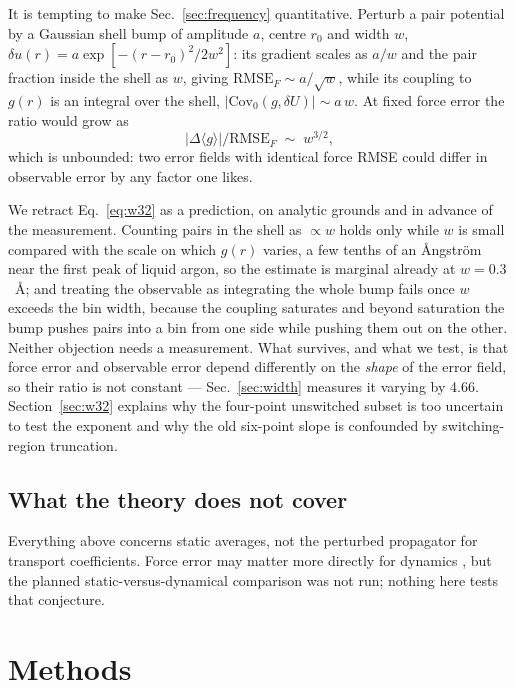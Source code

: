\documentclass[aip,jcp,reprint,amsmath,amssymb,floatfix]{revtex4-2}
\newcommand{\dU}{\ensuremath{\delta U}}
\newcommand{\avg}[1]{\ensuremath{\langle #1 \rangle}}
\newcommand{\Cov}{\ensuremath{\mathrm{Cov}}}
\begin{document}
It is tempting to make Sec.~\ref{sec:frequency} quantitative. Perturb a pair
potential by a Gaussian shell bump of
amplitude $a$, centre $r_0$ and width $w$, $\delta u(r) = a\exp[-(r-r_0)^2 /
2w^2]$: its gradient scales as $a/w$ and the pair fraction inside the shell
as $w$, giving $\mathrm{RMSE}_F \sim a/\sqrt{w}$, while its coupling to $g(r)$
is an integral over the shell, $|\Cov_0(g,\dU)| \sim a\,w$. At fixed force error
the ratio would grow as
\begin{equation}
\big|\Delta\avg{g}\big| \big/ \mathrm{RMSE}_F \;\sim\; w^{3/2},
\label{eq:w32}
\end{equation}
which is unbounded: two error fields with identical force RMSE could differ in
observable error by any factor one likes.

We retract Eq.~\eqref{eq:w32} as a prediction, on analytic grounds and in
advance of the measurement. Counting pairs in the shell as $\propto w$ holds
only while $w$ is small compared with the scale on which $g(r)$ varies, a few
tenths of an \AA ngstr\"om near the first peak of liquid argon, so the
estimate is marginal already at $w = 0.3$~\AA; and treating the observable as
integrating the whole bump fails once $w$ exceeds the bin width, because the
coupling saturates and beyond saturation the bump pushes pairs into
a bin from one side while pushing them out on the other. Neither objection needs
a measurement. What survives, and what we test, is that force error and
observable error depend differently on the \emph{shape} of the error field, so
their ratio is not constant --- Sec.~\ref{sec:width} measures it
varying by 4.66. Section~\ref{sec:w32} explains why the four-point unswitched
subset is too uncertain to test the exponent and why the old six-point slope is
confounded by switching-region truncation.

\subsection{What the theory does not cover}
\label{sec:dynamics}

Everything above concerns static averages, not the perturbed propagator for
transport coefficients. Force error may matter more directly for dynamics
\cite{Wu2024}, but the planned static-versus-dynamical comparison was not run;
nothing here tests that conjecture.

\section{Methods}
\label{sec:methods}
\end{document}
